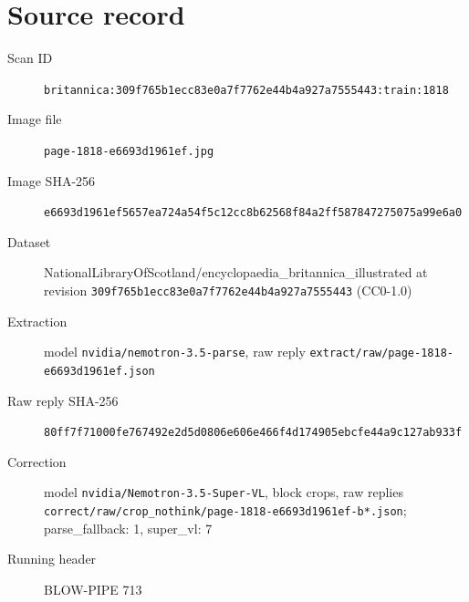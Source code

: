 \documentclass{article}
\begin{document}
\section*{Source record}
\begin{description}
\item[Scan ID] \texttt{britannica:309f765b1ecc83e0a7f7762e44b4a927a7555443:train:1818}
\item[Image file] \texttt{page-1818-e6693d1961ef.jpg}
\item[Image SHA-256] \texttt{e6693d1961ef5657ea724a54f5c12cc8b62568f84a2ff587847275075a99e6a0}
\item[Dataset] NationalLibraryOfScotland/encyclopaedia\_britannica\_illustrated at revision \texttt{309f765b1ecc83e0a7f7762e44b4a927a7555443} (CC0-1.0)
\item[Extraction] model \texttt{nvidia/nemotron-3.5-parse}, raw reply \texttt{extract/raw/page-1818-e6693d1961ef.json}
\item[Raw reply SHA-256] \texttt{80ff7f71000fe767492e2d5d0806e606e466f4d174905ebcfe44a9c127ab933f}
\item[Correction] model \texttt{nvidia/Nemotron-3.5-Super-VL}, block crops, raw replies \texttt{correct/raw/crop\_nothink/page-1818-e6693d1961ef-b*.json}; parse\_fallback: 1, super\_vl: 7
\item[Running header] BLOW-PIPE 713
\end{description}
\end{document}
